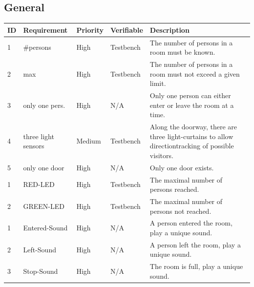\documentclass{article}
\begin{document}
\subsection{General}
\begin{center}
	\begin{tabular}{|p{1.5cm}|p{3.5cm}|p{1.5cm}|p{2cm}|p{5.5cm}|}
		\hline
		\textbf{ID} & \textbf{Requirement} & \textbf{Priority} & \textbf{Verifiable} & \textbf{Description} \\
		\hline
		\hline
		1 &  \#persons &  High &  Testbench & The number of persons in a room must be known. \\
		\hline
		2 & max & High &  Testbench & The number of persons in a room must not exceed a given limit. \\
		\hline
		3 &  only one pers. & High & N/A & Only one person can either enter or leave the room at a time. \\
		\hline
		4 &  three light sensors & Medium & Testbench & Along the doorway, there are three light-curtains to allow directiontracking of possible visitors. \\
		\hline
		5 &  only one door & High & N/A & Only one door exists. \\
		\hline
	
		1 &  RED-LED &  High & Testbench & The maximal number of persons reached. \\
		\hline
		2 & GREEN-LED & High & Testbench & The maximal number of persons not reached. \\
		\hline
	
	
		1 &  Entered-Sound & High & N/A & A person entered the room, play a unique sound. \\
		\hline
		2 & Left-Sound & High & N/A & A person left the room, play a unique sound. \\
		\hline
		3 &  Stop-Sound & High & N/A & The room is full, play a unique sound. \\
		\hline
	\end{tabular}
\end{center}
\end{document}
